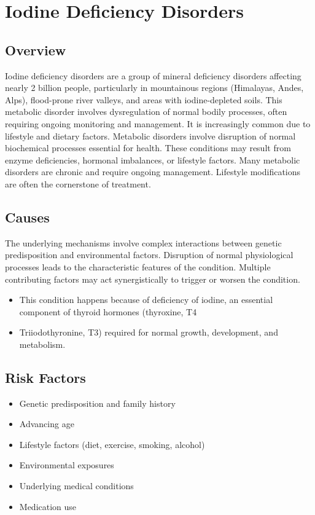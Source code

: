 \chapter{Iodine Deficiency Disorders}
\label{sec:Iodine Deficiency Disorders}

\section{Overview}
Iodine deficiency disorders are a group of mineral deficiency disorders affecting nearly 2 billion people, particularly in mountainous regions (Himalayas, Andes, Alps), flood-prone river valleys, and areas with iodine-depleted soils. This metabolic disorder involves dysregulation of normal bodily processes, often requiring ongoing monitoring and management. It is increasingly common due to lifestyle and dietary factors. Metabolic disorders involve disruption of normal biochemical processes essential for health. These conditions may result from enzyme deficiencies, hormonal imbalances, or lifestyle factors. Many metabolic disorders are chronic and require ongoing management. Lifestyle modifications are often the cornerstone of treatment.
\section{Causes}
The underlying mechanisms involve complex interactions between genetic predisposition and environmental factors. Disruption of normal physiological processes leads to the characteristic features of the condition. Multiple contributing factors may act synergistically to trigger or worsen the condition.

\begin{itemize}[noitemsep]
  \item This condition happens because of deficiency of iodine, an essential component of thyroid hormones (thyroxine, T4
  \item Triiodothyronine, T3) required for normal growth, development, and metabolism.
\end{itemize}
\section{Risk Factors}
\begin{itemize}[noitemsep]
  \item Genetic predisposition and family history
  \item Advancing age
  \item Lifestyle factors (diet, exercise, smoking, alcohol)
  \item Environmental exposures
  \item Underlying medical conditions
  \item Medication use
\end{itemize}
